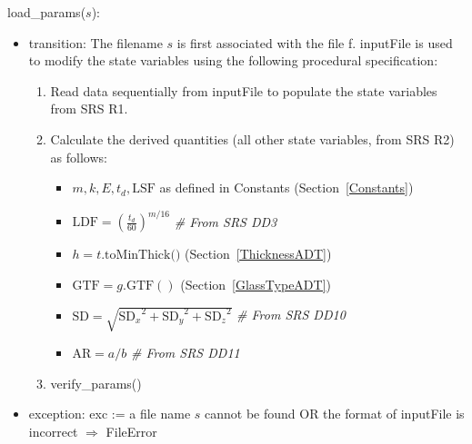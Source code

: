 \documentclass[12pt, titlepage]{article}
\begin{document}
\noindent load\_params($s$):
\begin{itemize}
\item transition: The filename $s$ is first associated with the file f.  {inputFile} is used to
  modify the state variables using the following procedural specification:
\begin{enumerate}
\item Read data sequentially from inputFile to populate the state variables from
  SRS R1.
\item Calculate the derived quantities (all other state variables, from SRS R2) as follows:
\begin{itemize}
\item $m, k, E, t_d, \mbox{LSF}$ as defined in Constants
  (Section~\ref{Constants})
\item $\text{LDF}=(\frac{t_d}{60})^{m/16}$ \textit{\# From SRS DD3}
\item $h = t.\mbox{toMinThick()}$ (Section~\ref{ThicknessADT})
\item $\mbox{GTF} = g.\mbox{GTF}()$ (Section~\ref{GlassTypeADT})
\item $\mbox{SD} = \sqrt{{\text{SD}_x}^2 + {\text{SD}_y}^2 + {\text{SD}_z}^2}$ \textit{\# From SRS DD10}
\item $\mbox{AR} = a/b$ \textit{\# From SRS DD11}
\end{itemize}
\item verify\_params()
\end{enumerate}

\item exception: exc := a file name $s$ cannot be found OR the format of
  inputFile is incorrect $\Rightarrow$  FileError
\end{itemize}
\end{document}
